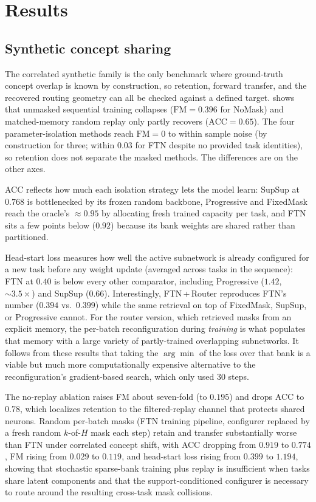 \documentclass[11pt]{article}
\begin{document}
\section{Results}


\subsection{Synthetic concept sharing}\label{sec:results_synthetic}

The correlated synthetic family is the only benchmark where ground-truth concept overlap is known by construction, so retention, forward transfer, and the recovered routing geometry can all be checked against a defined target.  shows that unmasked sequential training collapses ($\mathrm{FM}{=}0.396$ for NoMask) and matched-memory random replay only partly recovers ($\mathrm{ACC}{=}0.65$). The four parameter-isolation methods reach $\mathrm{FM}{=}0$ to within sample noise (by construction for three; within $0.03$ for FTN despite no provided task identities), so retention does not separate the masked methods. The differences are on the other axes.

ACC reflects how much each isolation strategy lets the model learn: SupSup at $0.768$ is bottlenecked by its frozen random backbone, Progressive and FixedMask reach the oracle's $\approx 0.95$ by allocating fresh trained capacity per task, and FTN sits a few points below ($0.92$) because its bank weights are shared rather than partitioned.

Head-start loss measures how well the active subnetwork is already configured for a new task before any weight update (averaged across tasks in the sequence): FTN at $0.40$ is below every other comparator, including Progressive ($1.42$, ${\sim}3.5\times$) and SupSup ($0.66$).
Interestingly, FTN\,+\,Router reproduces FTN's number ($0.394$ vs.\ $0.399$) while the same retrieval on top of FixedMask, SupSup, or Progressive cannot.
For the router version, which retrieved masks from an explicit memory, the per-batch reconfiguration during \emph{training} is what populates that memory with a large variety of partly-trained overlapping subnetworks. It follows from these results that taking the $\arg\min$ of the loss over that bank is a viable but much more computationally expensive alternative to the reconfiguration's gradient-based search, which only used 30 steps.

The no-replay ablation raises FM about seven-fold (to $0.195$) and drops ACC to $0.78$, which localizes retention to the filtered-replay channel that protects shared neurons. Random per-batch masks (FTN training pipeline, configurer replaced by a fresh random $k$-of-$H$ mask each step) retain and transfer substantially worse than FTN under correlated concept shift, with ACC dropping from $0.919$ to $0.774$, FM rising from $0.029$ to $0.119$, and head-start loss rising from $0.399$ to $1.194$, showing that stochastic sparse-bank training plus replay is insufficient when tasks share latent components and that the support-conditioned configurer is necessary to route around the resulting cross-task mask collisions.
\end{document}
